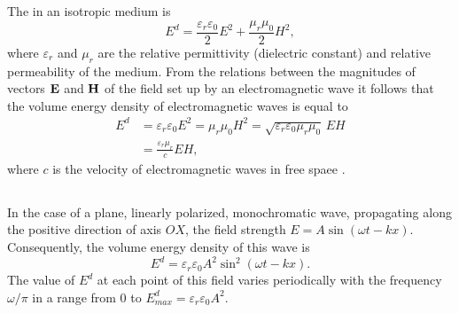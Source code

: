 \subsection{}\label{31.2.1} The  in an isotropic medium is
\begin{equation*}%
E^{d} = \frac{\varepsilon_{r} \varepsilon_{0}}{2}E^{2} + \frac{\mu_{r}\mu_{0}}{2} H^{2},
\end{equation*}
where $\varepsilon_{r}$ and $\mu_{r}$ are the relative permittivity (dielectric constant) and relative permeability of the medium. From the relations between the magnitudes of vectors $\vb{E}$ and $\vb{H}$ of the field set up by an electromagnetic wave  it follows that the volume energy density of electromagnetic waves is equal to
\begin{align*}%
E^{d} & = \varepsilon_{r} \varepsilon_{0} E^{2} = \mu_{r}\mu_{0} H^{2} = \sqrt{\varepsilon_{r} \varepsilon_{0} \mu_{r}\mu_{0}} \, EH \\
& = \frac{\varepsilon_{r}\mu_{r}}{c} EH,
\end{align*}
where $c$ is the velocity of electromagnetic waves in free spaee
.

\subsection{}\label{31.2.2} In the case of a plane, linearly polarized, monochromatic wave, propagating along the positive direction of axis $OX$, the field strength $E = A \sin (\omega t - kx)$. Consequently, the volume energy density of this wave is
\begin{equation*}%
E^{d} = \varepsilon_{r} \varepsilon_{0} A^{2} \sin^{2} (\omega t - kx).
\end{equation*}
The value of $E^{d}$ at each point of this field varies periodically with the frequency $\omega /\pi$ in a range from 0 to $E^{d}_{max} = \varepsilon_{r} \varepsilon_{0}A^{2}$.


